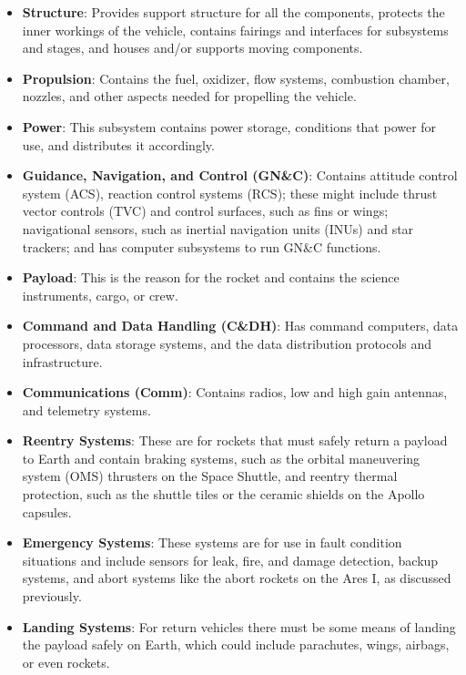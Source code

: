 \begin{enumerate}
\begin{itemize}
	\item {\bf Structure}: Provides support structure for all the components, protects the inner workings of the vehicle, contains fairings and interfaces for subsystems and stages, and houses and/or supports moving components.
	\item {\bf Propulsion}: Contains the fuel, oxidizer, flow systems, combustion chamber, nozzles, and other aspects needed for propelling the vehicle.
	\item {\bf Power}: This subsystem contains power storage, conditions that power for use, and distributes it accordingly.
	\item {\bf Guidance, Navigation, and Control (GN\&C)}: Contains attitude control system (ACS), reaction control systems (RCS); these might include thrust vector controls (TVC) and control surfaces, such as fins or wings; navigational sensors, such as inertial navigation units (INUs) and star trackers; and has computer subsystems to run GN\&C functions.
	\item {\bf Payload}: This is the reason for the rocket and contains the science instruments, cargo, or crew.
	\item {\bf Command and Data Handling (C\&DH)}: Has command computers, data processors, data storage systems, and the data distribution protocols and infrastructure.
	\item {\bf Communications (Comm)}: Contains radios, low and high gain antennas, and telemetry systems.
	\item {\bf Reentry Systems}: These are for rockets that must safely return a payload to Earth and contain braking systems, such as the orbital maneuvering system (OMS) thrusters on the Space Shuttle, and reentry thermal protection, such as the shuttle tiles or the ceramic shields on the Apollo capsules.
	\item {\bf Emergency Systems}: These systems are for use in fault condition situations and include sensors for leak, fire, and damage detection, backup systems, and abort systems like the abort rockets on the Ares I, as discussed previously.
	\item {\bf Landing Systems}: For return vehicles there must be some means of landing the payload safely on Earth, which could include parachutes, wings, airbags, or even rockets. \cite{book}


\end{itemize}


\end{enumerate}